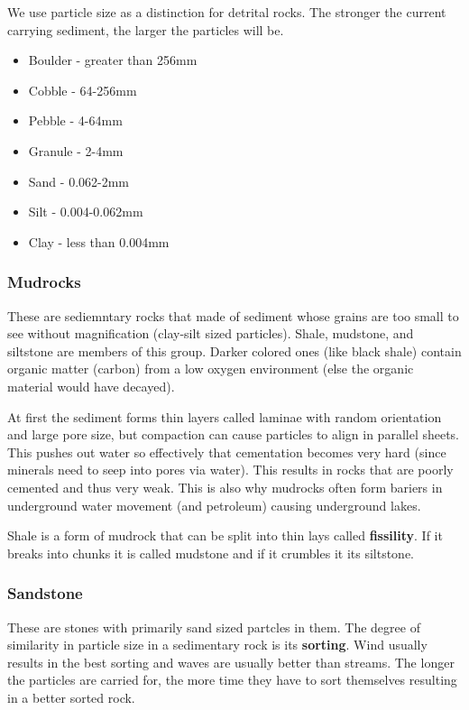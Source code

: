 \documentclass{article}
\begin{document}
We use particle size as a distinction for detrital rocks. The stronger the current carrying sediment, the larger the particles will be.

\begin{itemize}
    \item Boulder - greater than 256mm
    \item Cobble - 64-256mm
    \item Pebble - 4-64mm
    \item Granule - 2-4mm
    \item Sand - 0.062-2mm
    \item Silt - 0.004-0.062mm
    \item Clay - less than 0.004mm
\end{itemize}

\subsubsection{Mudrocks} %
\label{sub:mudrocks}
These are sediemntary rocks that made of sediment whose grains are too small to see without magnification (clay-silt sized particles). Shale, mudstone, and siltstone are members of this group. Darker colored ones (like black shale) contain organic matter (carbon) from a low oxygen environment (else the organic material would have decayed).

At first the sediment forms thin layers called laminae with random orientation and large pore size, but compaction can cause particles to align in parallel sheets. This pushes out water so effectively that cementation becomes very hard (since minerals need to seep into pores via water). This results in rocks that are poorly cemented and thus very weak. This is also why mudrocks often form bariers in underground water movement (and petroleum) causing underground lakes.

Shale is a form of mudrock that can be split into thin lays called \textbf{fissility}. If it breaks into chunks it is called mudstone and if it crumbles it its siltstone.

\subsubsection{Sandstone} %
\label{sub:sandstone}
These are stones with primarily sand sized partcles in them. The degree of similarity in particle size in a sedimentary rock is its \textbf{sorting}. Wind usually results in the best sorting and waves are usually better than streams. The longer the particles are carried for, the more time they have to sort themselves resulting in a better sorted rock.
\end{document}
